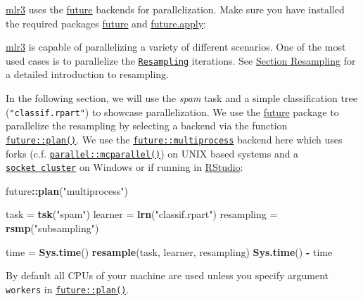 \documentclass[]{article}
\newenvironment{Shaded}{\begin{snugshade}}{\end{snugshade}}
\newcommand{\KeywordTok}[1]{\textcolor[rgb]{0.13,0.29,0.53}{\textbf{#1}}}
\newcommand{\NormalTok}[1]{#1}
\newcommand{\OperatorTok}[1]{\textcolor[rgb]{0.81,0.36,0.00}{\textbf{#1}}}
\newcommand{\StringTok}[1]{\textcolor[rgb]{0.31,0.60,0.02}{#1}}
\renewenvironment{Shaded} {\begin{snugshade}\small} {\end{snugshade}}
\begin{document}
\href{https://mlr3.mlr-org.com}{mlr3} uses the \href{https://cran.r-project.org/package=future}{future} backends for parallelization.
Make sure you have installed the required packages \href{https://cran.r-project.org/package=future}{future} and \href{https://cran.r-project.org/package=future.apply}{future.apply}:

\href{https://mlr3.mlr-org.com}{mlr3} is capable of parallelizing a variety of different scenarios.
One of the most used cases is to parallelize the \href{https://mlr3.mlr-org.com/reference/Resampling.html}{\texttt{Resampling}} iterations.
See \protect\hyperlink{resampling}{Section Resampling} for a detailed introduction to resampling.

In the following section, we will use the \emph{spam} task and a simple classification tree (\texttt{"classif.rpart"}) to showcase parallelization.
We use the \href{https://cran.r-project.org/package=future}{future} package to parallelize the resampling by selecting a backend via the function \href{https://www.rdocumentation.org/packages/future/topics/plan}{\texttt{future::plan()}}.
We use the \href{https://www.rdocumentation.org/packages/future/topics/multiprocess}{\texttt{future::multiprocess}} backend here which uses forks (c.f. \href{https://www.rdocumentation.org/packages/parallel/topics/mcparallel}{\texttt{parallel::mcparallel()}}) on UNIX based systems and a \href{https://www.rdocumentation.org/packages/parallel/topics/makePSockCluster}{\texttt{socket\ cluster}} on Windows or if running in \href{https://rstudio.com/}{RStudio}:

\begin{Shaded}
\begin{Highlighting}[]
\NormalTok{future}\OperatorTok{::}\KeywordTok{plan}\NormalTok{(}\StringTok{"multiprocess"}\NormalTok{)}

\NormalTok{task =}\StringTok{ }\KeywordTok{tsk}\NormalTok{(}\StringTok{"spam"}\NormalTok{)}
\NormalTok{learner =}\StringTok{ }\KeywordTok{lrn}\NormalTok{(}\StringTok{"classif.rpart"}\NormalTok{)}
\NormalTok{resampling =}\StringTok{ }\KeywordTok{rsmp}\NormalTok{(}\StringTok{"subsampling"}\NormalTok{)}

\NormalTok{time =}\StringTok{ }\KeywordTok{Sys.time}\NormalTok{()}
\KeywordTok{resample}\NormalTok{(task, learner, resampling)}
\KeywordTok{Sys.time}\NormalTok{() }\OperatorTok{-}\StringTok{ }\NormalTok{time}
\end{Highlighting}
\end{Shaded}

By default all CPUs of your machine are used unless you specify argument \texttt{workers} in \href{https://www.rdocumentation.org/packages/future/topics/plan}{\texttt{future::plan()}}.
\end{document}
